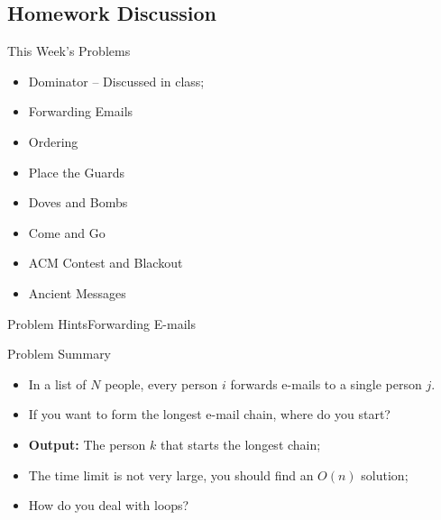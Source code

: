 \subsection{Homework Discussion}

\begin{frame}{This Week's Problems}
  \begin{itemize}
  \item Dominator -- Discussed in class;
  \item Forwarding Emails
  \item Ordering
  \item Place the Guards
  \item Doves and Bombs
  \item Come and Go
  \item ACM Contest and Blackout
  \item Ancient Messages
  \end{itemize}
\end{frame}


\begin{frame}{Problem Hints}{Forwarding E-mails}
  \begin{block}{Problem Summary}
    \begin{itemize}
      \item In a list of $N$ people, every person $i$ forwards e-mails to a single person $j$.
      \item If you want to form the longest e-mail chain, where do you start?
      \item {\bf Output:} The person $k$ that starts the longest chain;
    \end{itemize}
  \end{block}\bigskip

  \begin{itemize}
    \item The time limit is not very large, you should find an $O(n)$ solution;
    \medskip

    \item How do you deal with loops?
  \end{itemize}
\end{frame}

